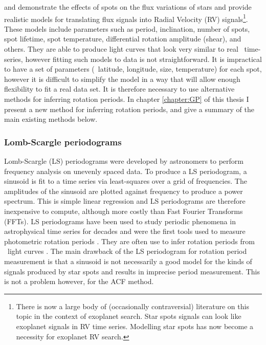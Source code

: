 \citet{Aigrain2012} and \citet{Dumusque2014} demonstrate the effects of spots
on the flux variations of stars and provide realistic models for translating
flux signals into Radial Velocity (RV) signals\footnote{There is now a large
body of (occasionally contraversial) literature on this topic in the context
of exoplanet search.
Star spots signals can look like exoplanet signals in RV time series.
Modelling star spots has now become a necessity for exoplanet RV search.}.
These models include parameters such as period, inclination, number of spots,
spot lifetime, spot temperature, differential rotation amplitude (shear), and
others.
They are able to produce light curves that look very similar to real \kepler\
time-series, however fitting such models to data is not straightforward.
It is impractical to have a set of parameters (\eg\ latitude, longitude, size,
temperature) for each spot, however it is difficult to simplify the model in a
way that will allow enough flexibility to fit a real data set.
It is therefore necessary to use alternative methods for inferring rotation
periods.
In chapter \ref{chapter:GP} of this thesis I present a new method for
inferring rotation periods, and give a summary of the main existing methods
below.

\subsubsection{Lomb-Scargle periodograms}
Lomb-Scargle (LS) periodograms \citep{Lomb1976, Scargle1982} were developed
by astronomers to perform frequency analysis on unevenly spaced data.
To produce a LS periodogram, a sinusoid is fit to a time series via
least-squares over a grid of frequencies.
The amplitudes of the sinusoid are plotted against frequency to produce a
power spectrum.
This is simple linear regression and LS periodograms are therefore
inexpensive to compute, although more costly than Fast Fourier Transforms
(FFTs).
LS periodograms have been used to study periodic phenomena in astrophysical
time series for decades and were the first tools used to measure photometric
rotation periods \citep[\eg][]{Scott1992, Mottola1995}.
They are often use to infer rotation periods from \kepler\ light curves
\citep[\eg][]{Reinhold2013, Reinhold2013b}.
The main drawback of the LS periodogram for rotation period measurement is
that a sinusoid is not necessarily a good model for the kinds of signals
produced by star spots and results in imprecise period measurement.
This is not a problem however, for the ACF method.


